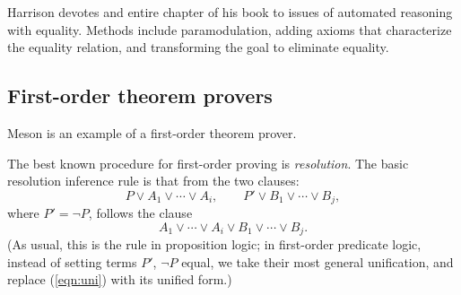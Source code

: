 \documentclass{llncs}
\begin{document}
Harrison devotes and entire chapter
of his book to issues of automated reasoning with equality.
Methods include paramodulation, adding axioms that characterize the equality
relation, and transforming the goal to eliminate equality.


\subsection{First-order theorem provers}

Meson is an example of a first-order theorem prover.   

The best known procedure for first-order proving is {\it resolution}.
The basic resolution inference rule is that from the two clauses:
\[
P \lor A_1 \lor \cdots \lor A_i,\qquad P' \lor B_1 \lor \cdots\lor B_j,
\]
where $P' = \lnot P$,
follows the clause
\begin{equation}\label{eqn:uni}
A_1\lor \cdots \lor A_i \lor B_1 \lor \cdots \lor B_j.
\end{equation}
(As usual, this is the rule in proposition logic; in first-order
predicate logic, instead of setting terms $P'$, $\lnot P$ equal,
we take their most general unification,  and
replace (\ref{eqn:uni}) with its unified form.)
\end{document}
